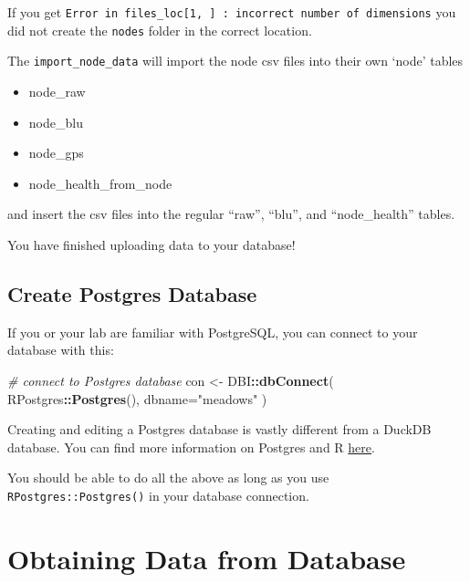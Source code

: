 \documentclass[
]{book}
\newenvironment{Shaded}{\begin{snugshade}}{\end{snugshade}}
\newcommand{\AttributeTok}[1]{\textcolor[rgb]{0.13,0.29,0.53}{#1}}
\newcommand{\CommentTok}[1]{\textcolor[rgb]{0.56,0.35,0.01}{\textit{#1}}}
\newcommand{\FunctionTok}[1]{\textcolor[rgb]{0.13,0.29,0.53}{\textbf{#1}}}
\newcommand{\NormalTok}[1]{#1}
\newcommand{\OtherTok}[1]{\textcolor[rgb]{0.56,0.35,0.01}{#1}}
\newcommand{\SpecialCharTok}[1]{\textcolor[rgb]{0.81,0.36,0.00}{\textbf{#1}}}
\newcommand{\StringTok}[1]{\textcolor[rgb]{0.31,0.60,0.02}{#1}}
\providecommand{\tightlist}{%
  \setlength{\itemsep}{0pt}\setlength{\parskip}{0pt}}
\begin{document}
If you get \texttt{Error\ in\ files\_loc{[}1,\ {]}\ :\ incorrect\ number\ of\ dimensions} you did not create the \texttt{nodes} folder in the correct location.

The \texttt{import\_node\_data} will import the node csv files into their own `node' tables

\begin{itemize}
\tightlist
\item
  node\_raw
\item
  node\_blu
\item
  node\_gps
\item
  node\_health\_from\_node
\end{itemize}

and insert the csv files into the regular ``raw'', ``blu'', and ``node\_health'' tables.

You have finished uploading data to your database!

\section{Create Postgres Database}\label{create-postgres-database}

If you or your lab are familiar with PostgreSQL, you can connect to your database with this:

\begin{Shaded}
\begin{Highlighting}[]
\CommentTok{\# connect to Postgres database}
\NormalTok{con }\OtherTok{\textless{}{-}}\NormalTok{ DBI}\SpecialCharTok{::}\FunctionTok{dbConnect}\NormalTok{(}
\NormalTok{  RPostgres}\SpecialCharTok{::}\FunctionTok{Postgres}\NormalTok{(),}
  \AttributeTok{dbname=}\StringTok{"meadows"}
\NormalTok{)}
\end{Highlighting}
\end{Shaded}

Creating and editing a Postgres database is vastly different from a DuckDB database. You can find more information on Postgres and R \href{https://faculty.washington.edu/phurvitz/r_sql/createdb.html}{here}.

You should be able to do all the above as long as you use \texttt{RPostgres::Postgres()} in your database connection.

\chapter{Obtaining Data from Database}\label{obtaining-data-from-database}
\end{document}
